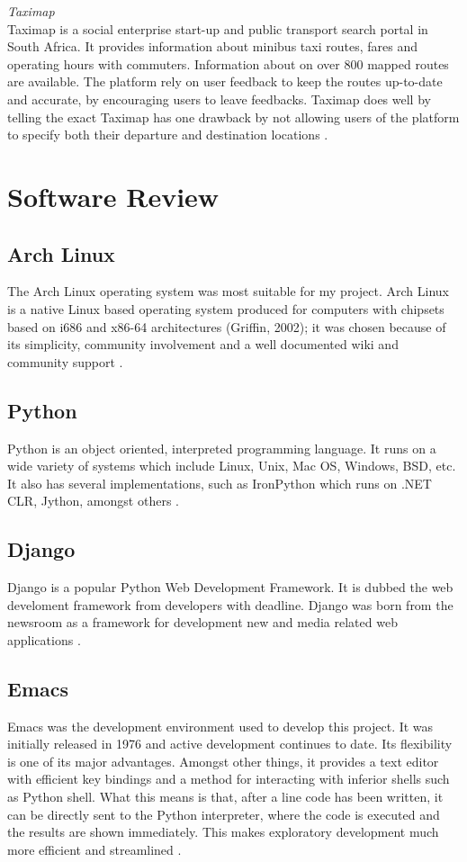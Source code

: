 \textit{Taximap}\\
Taximap is a social enterprise start-up and public transport search portal in South Africa. It provides information about minibus taxi routes, fares and operating hours with commuters. Information about on over 800 mapped routes are available. The platform rely on user feedback to keep the routes up-to-date and accurate, by encouraging users to leave feedbacks. Taximap does well by telling the exact Taximap has one drawback by not allowing users of the platform to specify both their departure and destination locations \citep{neumann_toward_2015}.

\section{Software Review}

\subsection{Arch Linux}
The Arch Linux operating system was most suitable for my project. Arch Linux is a native Linux based operating system produced for computers with chipsets based on i686 and x86-64 architectures (Griffin, 2002); it was chosen because of its simplicity, community involvement and a well documented wiki and community support \citep{vinet2014arch}.

\subsection{Python}
Python is an object oriented, interpreted programming language. It runs on a wide variety of systems which include Linux, Unix, Mac OS, Windows, BSD, etc. It also has several implementations, such as IronPython which runs on .NET CLR, Jython, amongst others \citep{van2007python}. 

\subsection{Django}
Django is a popular Python Web Development Framework. It is dubbed the web develoment framework from developers with deadline. Django was born from the newsroom as a framework for development new and media related web applications \citep{holovaty2009definitive}.

\subsection{Emacs}
Emacs was the development environment used to develop this project. It was initially released in 1976 and active development continues to date. Its flexibility is one of its major advantages. Amongst other things, it provides a text editor with efficient key bindings and a method for interacting with inferior shells such as Python shell. What this means is that, after a line code has been written, it can be directly sent to the Python interpreter, where the code is executed and the results are shown immediately. This makes exploratory development much more efficient and streamlined \citep{stallman1981emacs}. 

